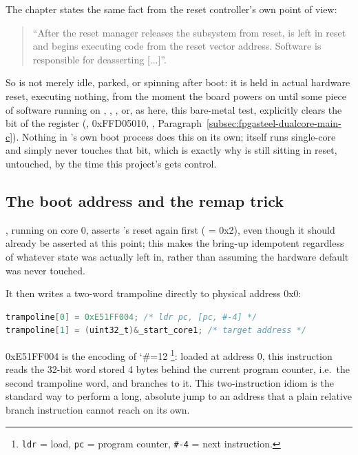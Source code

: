 The  chapter \cite[Chapter 4, ``Reset Sequencing'', p.~4-11]{CV-TRM} states the same fact from the reset controller's own point of view:

\begin{quote}
    ``After the reset manager releases the  subsystem from reset,  is left in reset and  begins executing code from the reset vector address. Software is responsible for deasserting [...]''.
\end{quote}

So  is not merely idle, parked, or spinning after boot: it is held in actual hardware reset, executing nothing, from the moment the board powers on until some piece of software running on , , , or, as here, this bare-metal test, explicitly clears the  bit of the  register (, 0xFFD05010, , Paragraph~\ref{subsec:fpgasteel-dualcore-main-c}). Nothing in 's own boot process does this on its own;  itself runs single-core and simply never touches that bit, which is exactly why  is still sitting in reset, untouched, by the time this project's  gets control.

\subsection{The boot address and the remap trick}
\label{subsec:fpgasteel-dualcore-boot-address}

, running on core 0, asserts 's reset again first ( = 0x2), even though it should already be asserted at this point; this makes the bring-up idempotent regardless of whatever state  was actually left in, rather than assuming the hardware default was never touched.

It then writes a two-word trampoline directly to physical address 0x0:

\begin{lstlisting}[language=C]
trampoline[0] = 0xE51FF004; /* ldr pc, [pc, #-4] */
trampoline[1] = (uint32_t)&_start_core1; /* target address */
\end{lstlisting}

0xE51FF004 is the  encoding of {\catcode`\#=12 }\footnote{\texttt{ldr} = load, \texttt{pc} = program counter, \texttt{\#-4} = next instruction.}: loaded at address 0, this instruction reads the 32-bit word stored 4 bytes behind the current program counter, i.e.\ the second trampoline word, and branches to it. This two-instruction idiom is the standard way to perform a long, absolute jump to an address that a plain relative branch instruction cannot reach on its own.

